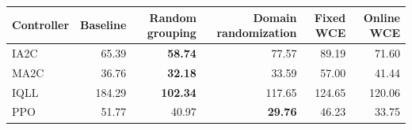 \begin{tabular}{lrrrrr}
\hline
Controller & Baseline & Random grouping & Domain randomization & Fixed WCE & Online WCE \\
\hline
IA2C & 65.39 & \textbf{58.74} & 77.57 & 89.19 & 71.60 \\
MA2C & 36.76 & \textbf{32.18} & 33.59 & 57.00 & 41.44 \\
IQLL & 184.29 & \textbf{102.34} & 117.65 & 124.65 & 120.06 \\
PPO & 51.77 & 40.97 & \textbf{29.76} & 46.23 & 33.75 \\
\hline
\end{tabular}
